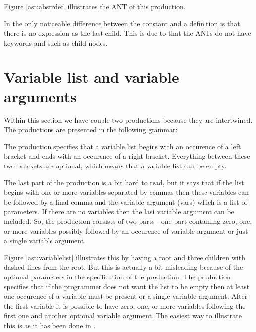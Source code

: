 Figure \ref{ast:abstrdef} illustrates the ANT of this production.



In  the only noticeable difference between the constant and 
a definition is that there is no expression as the last child.  This is due to
that the ANTs do not have keywords and such as child nodes.


\section{Variable list and variable arguments}
Within this section we have couple two productions because they are intertwined. 
The productions are presented in the following grammar:

\begin{ebnf}
\end{ebnf}

The production specifies that a variable list begins with an occurence of a left
bracket and ends with an occurence of a right bracket. Everything between these
two brackets are optional, which means that a variable list can be empty.

The last part of the production is a bit hard to read, but it says that if the
list begins with one or more variables separated by commas then these variables
can be followed by a final comma and the variable argument (vars) which is a
list of parameters. If there are no variables then the last variable argument
can be included. So, the production consists of two parts - one part containing
zero, one, or more variables possibly followed by an occurence of variable
argument or just a single variable argument.



Figure \ref{ast:variablelist} illustrates this by having a root and three
children with dashed lines from the root. But this is actually a bit misleading
because of the optional parameters in the specification of the production. The
production specifies that if the programmer does not want the list to be empty
then at least one occurence of a variable must be present or a single variable
argument. After the first variable it is possible to have zero, one, or more
variables following the first one and another optional variable argument. The
easiest way to illustrate this is as it has been done in
.

